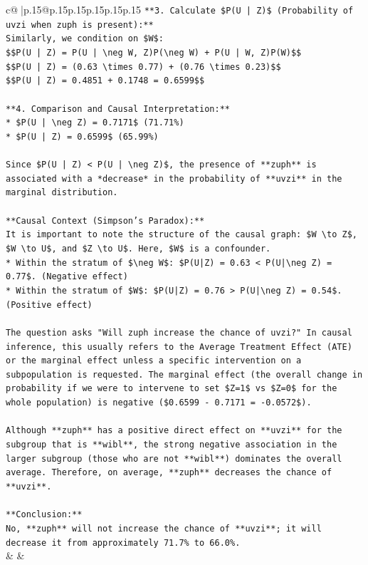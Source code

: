 \documentclass{article}
\begin{document}
{\begin{supertabular}{c@{$\;$}|p{.15\linewidth}@{}p{.15\linewidth}p{.15\linewidth}p{.15\linewidth}p{.15\linewidth}p{.15\linewidth}}
{{{\texttt{**3. Calculate \$P(U | Z)\$ (Probability of uvzi when zuph is present):**} \\
\texttt{Similarly, we condition on \$W\$:} \\
\texttt{\$\$P(U | Z) = P(U | \textbackslash{}neg W, Z)P(\textbackslash{}neg W) + P(U | W, Z)P(W)\$\$} \\
\texttt{\$\$P(U | Z) = (0.63 \textbackslash{}times 0.77) + (0.76 \textbackslash{}times 0.23)\$\$} \\
\texttt{\$\$P(U | Z) = 0.4851 + 0.1748 = 0.6599\$\$} \\
\\ 
\texttt{**4. Comparison and Causal Interpretation:**} \\
\texttt{*   \$P(U | \textbackslash{}neg Z) = 0.7171\$ (71.71\%)} \\
\texttt{*   \$P(U | Z) = 0.6599\$ (65.99\%)} \\
\\ 
\texttt{Since \$P(U | Z) < P(U | \textbackslash{}neg Z)\$, the presence of **zuph** is associated with a *decrease* in the probability of **uvzi** in the marginal distribution.} \\
\\ 
\texttt{**Causal Context (Simpson's Paradox):**} \\
\texttt{It is important to note the structure of the causal graph: \$W \textbackslash{}to Z\$, \$W \textbackslash{}to U\$, and \$Z \textbackslash{}to U\$. Here, \$W\$ is a confounder.} \\
\texttt{*   Within the stratum of \$\textbackslash{}neg W\$: \$P(U|Z) = 0.63 < P(U|\textbackslash{}neg Z) = 0.77\$. (Negative effect)} \\
\texttt{*   Within the stratum of \$W\$: \$P(U|Z) = 0.76 > P(U|\textbackslash{}neg Z) = 0.54\$. (Positive effect)} \\
\\ 
\texttt{The question asks "Will zuph increase the chance of uvzi?" In causal inference, this usually refers to the Average Treatment Effect (ATE) or the marginal effect unless a specific intervention on a subpopulation is requested. The marginal effect (the overall change in probability if we were to intervene to set \$Z=1\$ vs \$Z=0\$ for the whole population) is negative (\$0.6599 {-} 0.7171 = {-}0.0572\$).} \\
\\ 
\texttt{Although **zuph** has a positive direct effect on **uvzi** for the subgroup that is **wibl**, the strong negative association in the larger subgroup (those who are not **wibl**) dominates the overall average. Therefore, on average, **zuph** decreases the chance of **uvzi**.} \\
\\ 
\texttt{**Conclusion:**} \\
\texttt{No, **zuph** will not increase the chance of **uvzi**; it will decrease it from approximately 71.7\% to 66.0\%.} \\
            }
        }
    }
    & & \\ \\


\end{supertabular}}
\end{document}
